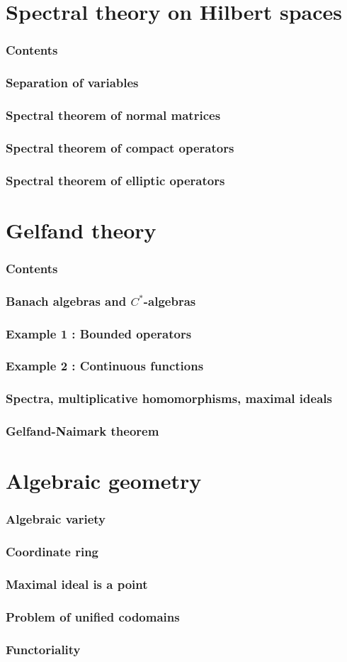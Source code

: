 \documentclass{beamer}
\begin{document}
\section{Spectral theory on Hilbert spaces}
\begin{frame}
\frametitle{Contents}
  \tableofcontents[currentsection]
\end{frame}

\begin{frame}
\frametitle{Separation of variables}
\end{frame}
\begin{frame}
\frametitle{Spectral theorem of normal matrices}
\end{frame}
\begin{frame}
\frametitle{Spectral theorem of compact operators}
\end{frame}
\begin{frame}
\frametitle{Spectral theorem of elliptic operators}
\end{frame}


\section{Gelfand theory}
\begin{frame}
\frametitle{Contents}
  \tableofcontents[currentsection]
\end{frame}

\begin{frame}
\frametitle{Banach algebras and $C^*$-algebras}
\end{frame}
\begin{frame}
\frametitle{Example 1 : Bounded operators}
\end{frame}
\begin{frame}
\frametitle{Example 2 : Continuous functions}
\end{frame}
\begin{frame}
\frametitle{Spectra, multiplicative homomorphisms, maximal ideals}
\end{frame}
\begin{frame}
\frametitle{Gelfand-Naimark theorem}
\end{frame}


\section{Algebraic geometry}
\begin{frame}
\frametitle{Algebraic variety}
\end{frame}
\begin{frame}
\frametitle{Coordinate ring}
\end{frame}
\begin{frame}
\frametitle{Maximal ideal is a point}
\end{frame}
\begin{frame}
\frametitle{Problem of unified codomains}
\end{frame}
\begin{frame}
\frametitle{Functoriality}
\end{frame}
\end{document}
